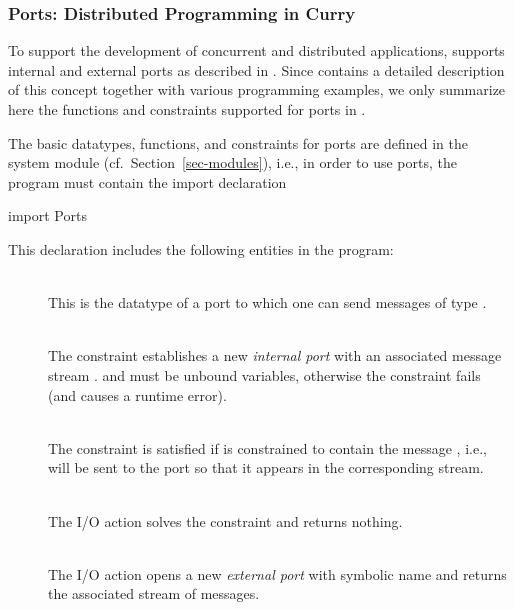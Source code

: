 {\subsubsection{Ports: Distributed Programming in Curry}
\label{sec-ports}

To support the development of concurrent and distributed applications,
\CYS supports internal and external ports as
described in \cite{Hanus99PPDP}.
Since \cite{Hanus99PPDP} contains a detailed description of this
concept together with various programming examples, we only summarize here
the functions and constraints supported for ports in \CYS.

The basic datatypes, functions, and constraints for ports
are defined in the system module 
(cf.\ Section~\ref{sec-modules}), i.e., in order to use ports,
the program must contain the import declaration
\begin{curry}
import Ports
\end{curry}
This declaration includes the following entities in the program:
\begin{description}
\item[]~\\
This is the datatype of a port to which one can send messages of type .

\item[]~\\
The constraint 
establishes a new \emph{internal port}
 with an associated message stream .  and  must be
unbound variables,
otherwise the constraint fails (and causes a runtime error).

\item[]~\\
The constraint 
is satisfied if  is constrained
to contain the message , i.e.,  will be sent to the port
 so that it appears in the corresponding stream.

\item[]~\\
The I/O action  solves the constraint
 and returns nothing.

\item[]~\\
The I/O action 
opens a new \emph{external port} with
symbolic name  and returns the associated stream of messages.


\end{description}}
